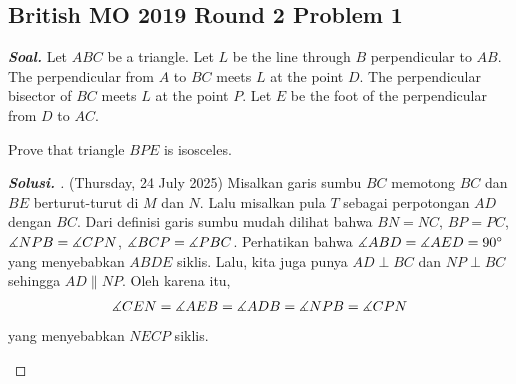 \documentclass[letterpaper, 13pt]{scrartcl}
\begin{document}
\subsection{British MO 2019 Round 2 Problem 1}

\textbf{\textit{Soal. }}Let $ABC$ be a triangle. Let $L$ be the line through $B$ perpendicular to $AB$. The perpendicular from $A$ to $BC$ meets $L$ at the point $D$. The perpendicular bisector of $BC$ meets $L$ at the point $P$. Let $E$ be the foot of the perpendicular from $D$ to $AC$.

Prove that triangle $BPE$ is isosceles.

\begin{proof}[\textbf{Solusi. }] (Thursday, 24 July 2025) 
    Misalkan garis sumbu $BC$ memotong $BC$ dan $BE$ berturut-turut di $M$ dan $N$. Lalu misalkan pula $T$ sebagai perpotongan $AD$ dengan $BC$.
    Dari definisi garis sumbu mudah dilihat bahwa $BN=NC$, $BP=PC$, $\measuredangle NPB = \measuredangle CPN$,  $\measuredangle BCP = \measuredangle PBC$. 
    Perhatikan bahwa $\measuredangle ABD = \measuredangle AED = 90^\circ$ yang menyebabkan $ABDE$ siklis.
    Lalu, kita juga punya $AD \perp BC$ dan $NP \perp BC$ sehingga $AD \parallel NP$.
    Oleh karena itu, 
    \begin{align*}
        \measuredangle CEN = \measuredangle AEB = \measuredangle ADB = \measuredangle NPB = \measuredangle CPN
    \end{align*}
    yang menyebabkan $NECP$ siklis.

\begin{center}
\end{center}
\end{proof}
\end{document}
